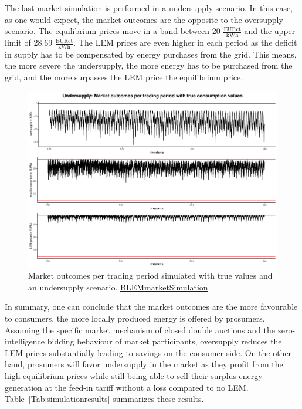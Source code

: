 The last market simulation is performed in a undersupply scenario. In this case, as one would expect, the market outcomes are the opposite to the oversupply scenario. The equilibrium prices move in a band between 20 $\frac{\text{EURct}}{\text{kWh}}$ and the upper limit of 28.69 $\frac{\text{EURct}}{\text{kWh}}$. The LEM prices are even higher in each period as the deficit in supply has to be compensated by energy purchases from the grid. This means, the more severe the undersupply, the more energy has to be purchased from the grid, and the more surpasses the LEM price the equilibrium price.
%
\begin{figure}[htbp]
    \centering
    \includegraphics[width=\textwidth]{thesis/graphs/marketsimulation/marketoutcome_true_undersupply.pdf}
    \caption[Market outcomes simulated with undersupply and true values]{Market outcomes per trading period simulated with true values and an undersupply scenario. \quantnet\href{https://github.com/QuantLet/BLEM/tree/master/BLEMmarketSimulation}{BLEMmarketSimulation}}
    \label{Fig:marketoutcomes_true_under}
\end{figure}
%

In summary, one can conclude that the market outcomes are the more favourable to consumers, the more locally produced energy is offered by prosumers. Assuming the specific market mechanism of closed double auctions and the zero-intelligence bidding behaviour of market participants, oversupply reduces the LEM prices substantially leading to savings on the consumer side. On the other hand, prosumers will favor undersupply in the market as they profit from the high equilibrium prices while still being able to sell their surplus energy generation at the feed-in tariff without a loss compared to no LEM. Table~\ref{Tab:simulationresults} summarizes these results.


